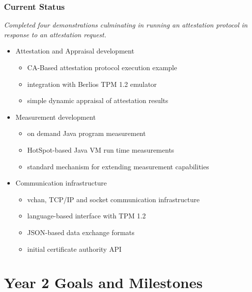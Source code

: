 \documentclass{beamer}
\begin{document}


\begin{frame}
  \frametitle{Current Status}

  \begin{center}
  \emph{\color{kublue}Completed four demonstrations culminating in
    running an attestation protocol in response to an attestation
    request.}
  \end{center}

  \begin{itemize}
  \item Attestation and Appraisal development
    \begin{itemize}
    \item CA-Based attestation protocol execution example
    \item integration with Berlios TPM 1.2 emulator
    \item simple dynamic appraisal of attestation results
    \end{itemize}
  \item Measurement development
    \begin{itemize}
    \item on demand Java program measurement
    \item HotSpot-based Java VM run time measurements
    \item standard mechanism for extending measurement capabilities
    \end{itemize}
  \item Communication infrastructure
    \begin{itemize}
    \item vchan, TCP/IP and socket communication infrastructure
    \item language-based interface with TPM 1.2
    \item JSON-based data exchange formats
    \item initial certificate authority API
    \end{itemize}
  \end{itemize}
\end{frame}

\section{Year 2 Goals and Milestones}
\end{document}
